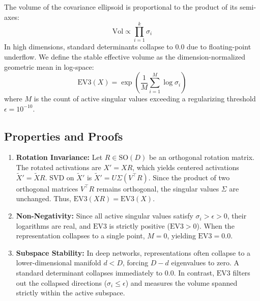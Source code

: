 \documentclass[twocolumn]{article}
\begin{document}
The volume of the covariance ellipsoid is proportional to the product of its semi-axes:
\begin{equation}
    \text{Vol} \propto \prod_{i=1}^k \sigma_i
\end{equation}
In high dimensions, standard determinants collapse to $0.0$ due to floating-point underflow. We define the stable effective volume as the dimension-normalized geometric mean in log-space:
\begin{equation}
    \text{EV3}(X) = \exp \left( \frac{1}{M} \sum_{i=1}^M \log \sigma_i \right)
\end{equation}
where $M$ is the count of active singular values exceeding a regularizing threshold $\epsilon = 10^{-10}$.

\subsection{Properties and Proofs}
\begin{enumerate}
    \item \textbf{Rotation Invariance:} Let $R \in \text{SO}(D)$ be an orthogonal rotation matrix. The rotated activations are $X' = X R$, which yields centered activations $\tilde{X}' = \tilde{X} R$. SVD on $\tilde{X}'$ is $\tilde{X}' = U \Sigma (V^\top R)$. Since the product of two orthogonal matrices $V^\top R$ remains orthogonal, the singular values $\Sigma$ are unchanged. Thus, $\text{EV3}(X R) = \text{EV3}(X)$.
    \item \textbf{Non-Negativity:} Since all active singular values satisfy $\sigma_i > \epsilon > 0$, their logarithms are real, and $\text{EV3}$ is strictly positive ($\text{EV3} > 0$). When the representation collapses to a single point, $M=0$, yielding $\text{EV3} = 0.0$.
    \item \textbf{Subspace Stability:} In deep networks, representations often collapse to a lower-dimensional manifold $d < D$, forcing $D - d$ eigenvalues to zero. A standard determinant collapses immediately to $0.0$. In contrast, $\text{EV3}$ filters out the collapsed directions ($\sigma_i \le \epsilon$) and measures the volume spanned strictly within the active subspace.
\end{enumerate}
\end{document}
